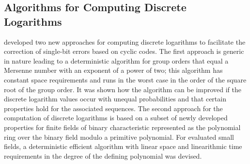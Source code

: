 \documentclass[a4paper, 11pt]{article}
\begin{document}
\subsection{Algorithms for Computing Discrete Logarithms}
\citet{grymel2013error} developed two new approaches for computing discrete logarithms to facilitate the correction of single-bit errors based on cyclic codes. The first approach is generic in nature leading to a deterministic algorithm for group orders that equal a Mersenne number with an exponent of a power of two; this algorithm has constant space requirements and runs in the worst case in the order of the square root of the group order. It was shown how the algorithm can be improved if the discrete logarithm values occur with unequal probabilities and that certain properties hold for the associated sequences. The second approach for the computation of discrete logarithms is based on a subset of newly developed properties for finite fields of binary characteristic represented as the polynomial ring over the binary field modulo a primitive polynomial. For evaluated small fields, a deterministic efficient algorithm with linear space and linearithmic time requirements in the degree of the defining polynomial was devised.

\newpage
%
%
%

\newpage


\end{document}
